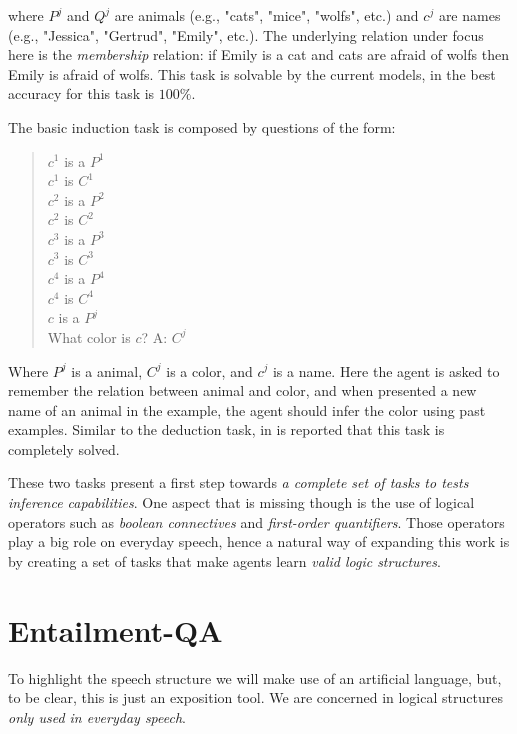where $P^j$ and $Q^j$ are animals (e.g., "cats", "mice", "wolfs", etc.) and $c^j$ are names (e.g., "Jessica", "Gertrud", "Emily", etc.). The underlying relation under focus here is the \textit{membership} relation: if Emily is a cat and cats are afraid of wolfs then Emily is afraid of wolfs. This task is solvable by the current models, in \cite{WestonBCM15} the best accuracy for this task is $100\%$. 

The basic induction task is composed by questions of the form:

\begin{quote} 
\centering 
$c^{1}$ is a $P^{1}$\\
$c^{1}$ is $C^{1}$\\
$c^{2}$ is a $P^{2}$\\
$c^{2}$ is $C^{2}$\\
$c^{3}$ is a $P^{3}$\\
$c^{3}$ is $C^{3}$\\
$c^{4}$ is a $P^{4}$\\
$c^{4}$ is $C^{4}$\\
$c$ is a $P^{j}$\\
What color is $c$? A: $C^{j}$\\
\end{quote}

Where $P^{j}$ is a animal, $C^{j}$ is a color, and $c^{j}$ is a name. Here the agent is asked to remember the relation between animal and color, and when presented a new name of an animal in the example, the agent should infer the color using past examples. Similar to the deduction task, in \cite{WestonBCM15} is reported that this task is completely solved.

These two tasks present a first step towards \textit{a complete set of tasks to tests inference capabilities}. One aspect that is missing though is the use of logical operators such as \textit{boolean connectives} and \textit{first-order quantifiers}. Those operators play a big role on everyday speech, hence a natural way of expanding this work is by creating a set of tasks that make agents learn \textit{valid logic structures}.

\section{Entailment-QA}
\label{ch:03-EQA}

To highlight the speech structure we will make use of an artificial language, but, to be clear, this is just an exposition tool. We are concerned in logical structures \textit{only used in everyday speech}.

